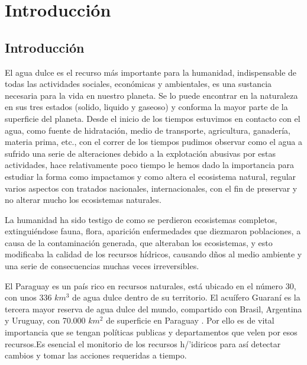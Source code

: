 

\chapter[Capítulo 1. Introducción]{Introducción}
\pagestyle{fancy}

\section{Introducción}

El agua dulce es el recurso más importante para la humanidad, indispensable de todas las actividades sociales, económicas y ambientales, es una sustancia necesaria para la vida en nuestro planeta. Se lo puede encontrar en la naturaleza en sus tres estados (solido, liquido y gaseoso) y conforma la  mayor parte de la superficie del planeta. Desde el inicio de los tiempos estuvimos en contacto con el agua, como fuente de hidrataci\'on, medio de transporte, agricultura, ganader\'ia, materia prima, etc., con el correr de los tiempos pudimos observar como el agua a sufrido una serie de alteraciones debido a la explotaci\'on abusivas por estas actividades, hace relativamente poco tiempo le hemos dado la importancia para estudiar la forma como impactamos y como altera el ecosistema natural, regular varios aspectos con tratados nacionales, internacionales, con el fin de preservar y no alterar mucho los ecosistemas naturales. %


La humanidad ha sido testigo de como se  perdieron  ecosistemas completos, extingui\'endose fauna, flora, aparici\'on enfermedades que diezmaron poblaciones, a causa de la contaminaci\'on generada, que alteraban los ecosistemas, y esto modificaba la calidad de los recursos h\'idricos, causando d\~nos al medio ambiente y una serie de consecuencias muchas veces irreversibles. 

El Paraguay es un pa\'is rico en recursos naturales, est\'a ubicado en el n\'umero 30, con unos 336 $km^{3}$ de agua dulce dentro de su territorio. El acu\'ifero Guaran\'i es la tercera mayor reserva de agua dulce del mundo, compartido con Brasil, Argentina y Uruguay, con 70.000 $km^{2}$ de superficie en Paraguay \cite{stp_Agua}. Por ello es de vital importancia que se tengan pol\'iticas publicas y departamentos que velen por esos recursos.Es esencial el monitorio de los recursos h/'idiricos para así detectar cambios y tomar las acciones requeridas a tiempo.

